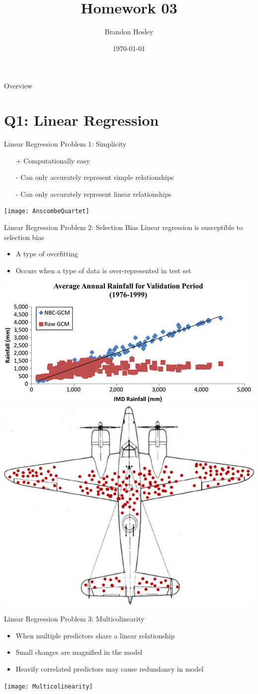 \documentclass{beamer}
\title{Homework 03}
\author{Brandon Hosley}
\institute{University of Illinois - Springfield}
\date{\today}
\begin{document}
\frame{\titlepage}

\begin{frame}{Overview}
\tableofcontents
\end{frame}

\section[Q1]{Q1: Linear Regression}

\begin{frame}{Linear Regression Problem 1: Simplicity}
	\begin{itemize}
		\item[+] Computationally easy
		\item[-] Can only accurately represent simple relationships
		\item[-] Can only accurately represent linear relationships
	\end{itemize}
	\texttt{[image: AnscombeQuartet]}
\end{frame}

\begin{frame}{Linear Regression Problem 2: Selection Bias}
	Linear regression is susceptible to selection bias
	\begin{itemize}
		\item A type of overfitting
		\item Occurs when a type of data is over-represented in test set
	\end{itemize}
	\includegraphics[width=0.45\linewidth]{SelectionBias}
	\includegraphics[width=0.45\linewidth]{SelectionAnecdote}
\end{frame}

\begin{frame}{Linear Regression Problem 3: Multicolinearity}
	\begin{itemize}
		\item When multiple predictors share a linear relationship
		\item Small changes are magnified in the model
		\item Heavily correlated predictors may cause redundancy in model
	\end{itemize}
	\texttt{[image: Multicolinearity]}
\end{frame}
\end{document}
